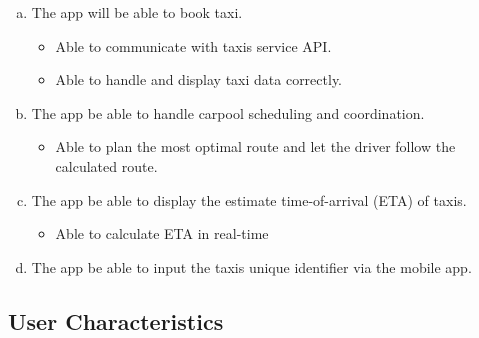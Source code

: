 \documentclass[]{article}
\begin{document}
\begin{enumerate}[a)]
	\item The app will be able to book taxi.

	\begin{itemize}
		\item Able to communicate with taxi\textquotesingle s service API.
		\item Able to handle and display taxi data correctly.	
	\end{itemize}
	\item The app be able to handle carpool scheduling and coordination.
	\begin{itemize}
		\item Able to plan the most optimal route and let the driver follow the calculated route.
	\end{itemize}
	\item The app be able to display the estimate time-of-arrival (ETA) of taxis.
	\begin{itemize}
		\item Able to calculate ETA in real-time
	\end{itemize}
	\item The app be able to input the taxi\textquotesingle s unique identifier via the mobile app.
\end{enumerate}


\subsection{User Characteristics}
\label{sub:user_characteristics}
\end{document}
